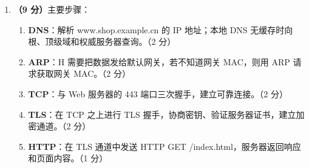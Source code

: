 \documentclass[a4paper,11pt]{article}
\begin{document}
\begin{enumerate}[start=13, label=\textbf{\arabic*.}, leftmargin=2.4em, itemsep=0.45em]
\item \textbf{（9 分）}主要步骤：
\begin{enumerate}[label=（\arabic*）, leftmargin=2.2em, itemsep=1pt]
  \item \textbf{DNS}：解析 www.shop.example.cn 的 IP 地址；本地 DNS 无缓存时向根、顶级域和权威服务器查询。\hfill（2 分）
  \item \textbf{ARP}：H 需要把数据发给默认网关，若不知道网关 MAC，则用 ARP 请求获取网关 MAC。\hfill（2 分）
  \item \textbf{TCP}：与 Web 服务器的 443 端口三次握手，建立可靠连接。\hfill（2 分）
  \item \textbf{TLS}：在 TCP 之上进行 TLS 握手，协商密钥、验证服务器证书，建立加密通道。\hfill（2 分）
  \item \textbf{HTTP}：在 TLS 通道中发送 HTTP GET /index.html，服务器返回响应和页面内容。\hfill（1 分）
\end{enumerate}

\end{enumerate}

\end{document}
